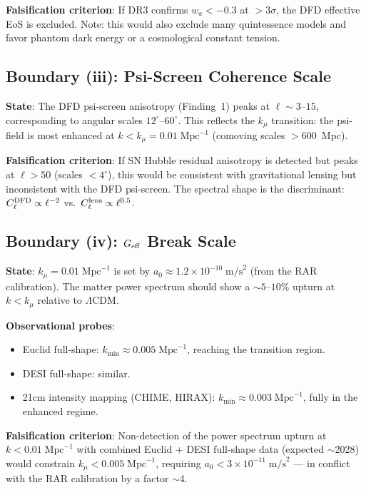 \documentclass[11pt,a4paper]{article}
\newcounter{findingctr}
\newenvironment{finding}[1][]{%
  \refstepcounter{findingctr}%
  \begin{tcolorbox}[colback=blue!3!white, colframe=blue!50!black,
    title=\textbf{Finding \thefindingctr: #1}]
}{%
  \end{tcolorbox}%
}
\newcommand{\LCDM}{$\Lambda$CDM}
\newcommand{\Geff}{G_{\rm eff}}
\begin{document}
\begin{finding}[\textbf{Framework Limits}: Four Falsifiable Boundaries]
\textbf{Falsification criterion}: If DR3 confirms $w_a < -0.3$ at
$> 3\sigma$, the DFD effective EoS is excluded.  Note: this would
also exclude many quintessence models and favor phantom dark energy
or a cosmological constant tension.

\subsection*{Boundary (iii): Psi-Screen Coherence Scale}

\textbf{State}: The DFD psi-screen anisotropy (Finding~1) peaks at
$\ell \sim 3$--$15$, corresponding to angular scales $12^\circ$--$60^\circ$.
This reflects the $k_\mu$ transition: the psi-field is most enhanced
at $k < k_\mu = 0.01\;\text{Mpc}^{-1}$ (comoving scales $> 600$~Mpc).

\textbf{Falsification criterion}: If SN Hubble residual anisotropy
is detected but peaks at $\ell > 50$ (scales $< 4^\circ$), this would
be consistent with gravitational lensing but inconsistent with the
DFD psi-screen.  The spectral shape is the discriminant:
$C_\ell^{\rm DFD} \propto \ell^{-2}$ vs.\
$C_\ell^{\rm lens} \propto \ell^{0.5}$.

\subsection*{Boundary (iv): $\Geff$ Break Scale}

\textbf{State}: $k_\mu = 0.01\;\text{Mpc}^{-1}$ is set by
$a_0 \approx 1.2 \times 10^{-10}\;\text{m/s}^2$ (from the RAR
calibration).  The matter power spectrum should show a $\sim 5$--$10\%$
upturn at $k < k_\mu$ relative to \LCDM.

\textbf{Observational probes}:
\begin{itemize}[nosep]
\item Euclid full-shape: $k_{\min} \approx 0.005\;\text{Mpc}^{-1}$,
  reaching the transition region.
\item DESI full-shape: similar.
\item 21cm intensity mapping (CHIME, HIRAX): $k_{\min} \approx
  0.003\;\text{Mpc}^{-1}$, fully in the enhanced regime.
\end{itemize}

\textbf{Falsification criterion}: Non-detection of the power
spectrum upturn at $k < 0.01\;\text{Mpc}^{-1}$ with combined
Euclid + DESI full-shape data (expected $\sim$2028) would
constrain $k_\mu < 0.005\;\text{Mpc}^{-1}$, requiring
$a_0 < 3 \times 10^{-11}\;\text{m/s}^2$ --- in conflict with
the RAR calibration by a factor $\sim$4.

\end{finding}
\end{document}
